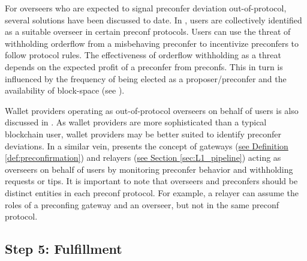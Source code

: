 \documentclass[a4paper]{article}
\theoremstyle{boldstyle}
\begin{document}
    For overseers who are expected to signal preconfer deviation out-of-protocol, several solutions have been discussed to date. In \cite{W:PreconfirmationFairExchange}, users are collectively identified as a suitable overseer in certain preconf protocols. Users can use the threat of withholding orderflow from a misbehaving preconfer to incentivize preconfers to follow protocol rules. The effectiveness of orderflow withholding as a threat depends on the expected profit of a preconfer from preconfs. This in turn is influenced by the frequency of being elected as a proposer/preconfer and the availability of block-space (see \cite{W:Future-ProofingPreconfirmations}).
    
    Wallet providers operating as out-of-protocol overseers on behalf of users is also discussed in \cite{W:PreconfirmationFairExchange}. As wallet providers are more sophisticated than a typical blockchain user, wallet providers may be better suited to identify preconfer deviations.
    In a similar vein, \cite{W:ThePreconfirmationGatewayUnlockingPreconfirmations:FromUsertoPreconfer} presents the concept of gateways (\hyperref[def:preconfirmation]{see Definition \ref{def:preconfirmation}}) and relayers (\hyperref[sec:L1_pipeline]{see Section \ref{sec:L1_pipeline}}) acting as overseers on behalf of users by monitoring preconfer behavior and withholding requests or tips. It is important to note that overseers and preconfers should be distinct entities in each preconf protocol. For example, a relayer can assume the roles of a preconfing gateway and an overseer, but not in the same preconf protocol.  

\subsection{Step 5: Fulfillment }\label{preconf_delivery}
\end{document}
